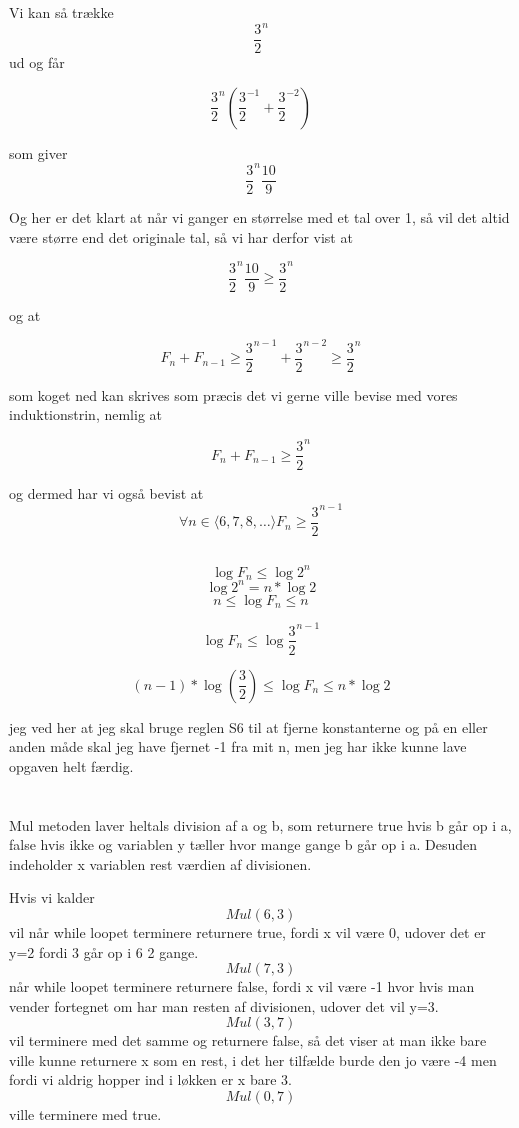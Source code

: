 \documentclass[12pt, a4paper, hidelinks]{article}
\begin{document}
Vi kan så trække $$ \frac{3}{2}^{n} $$ ud og får

$$ \frac{3}{2}^{n} ( \frac{3}{2}^{-1} + \frac{3}{2}^{-2} ) $$

som giver $$ \frac{3}{2}^{n} \frac{10}{9} $$

Og her er det klart at når vi ganger en størrelse med et tal over 1, så vil det altid være større end
det originale tal, så vi har derfor vist at

$$ \frac{3}{2}^{n} \frac{10}{9} \geq \frac{3}{2}^{n} $$

og at

$$ F_{n} + F_{n-1} \geq \frac{3}{2}^{n-1} + \frac{3}{2}^{n-2} \geq \frac{3}{2}^{n} $$

som koget ned kan skrives som præcis det vi gerne ville bevise med vores induktionstrin, nemlig at

$$ F_{n} + F_{n-1} \geq \frac{3}{2}^{n} $$

og dermed har vi også bevist at 
$$  \forall n \in \langle 6, 7, 8, \ldots \rangle F_{n} \geq \frac{3}{2}^{n-1}  $$

\subsection{}

$$ \log{F_{n}} \leq \log{2^n} $$
$$ \log{2^{n}} = n * \log{2} $$
$$ n \leq \log{F_{n}} \leq n $$

$$ \log{F_{n}} \leq \log{\frac{3}{2}^{n-1}} $$

$$ (n-1) * \log{(\frac{3}{2})} \leq \log{F_{n}} \leq n * \log{2} $$

jeg ved her at jeg skal bruge reglen S6 til at fjerne konstanterne og på en eller anden måde 
skal jeg have fjernet -1 fra mit n, men jeg har ikke kunne lave opgaven helt færdig.

\section{}
\subsection{}
Mul metoden laver heltals division af a og b, som returnere true hvis b går op i a, false hvis ikke og variablen y tæller hvor mange gange b går op i a.
Desuden indeholder x variablen rest værdien af divisionen.

Hvis vi kalder $$ Mul(6, 3) $$ vil når while loopet terminere returnere true, fordi x vil være 0, udover det er y=2  fordi 3 går op i 6 2 gange. \\
$$ Mul(7, 3) $$ når while loopet terminere returnere false, fordi x vil være -1 hvor hvis man vender fortegnet om har man resten af divisionen, udover det vil y=3.\\
$$ Mul(3, 7) $$ vil terminere med det samme og returnere false, så det viser at man ikke bare ville kunne returnere x som en rest, i det her tilfælde burde den jo være -4 men fordi vi aldrig hopper ind i løkken er x bare 3. \\
$$ Mul(0, 7) $$ ville terminere med true.\\ 
\end{document}
